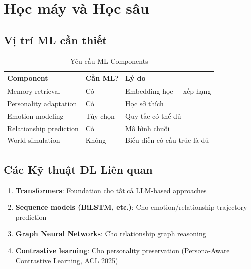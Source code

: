 \section{Học máy và Học sâu}

\subsection{Vị trí ML cần thiết}

\begin{table}[H]
\centering
\caption{Yêu cầu ML Components}
\label{tab:ml-requirements}
\begin{tabular}{lll}
\toprule
\textbf{Component} & \textbf{Cần ML?} & \textbf{Lý do} \\
\midrule
Memory retrieval & Có & Embedding học + xếp hạng \\
Personality adaptation & Có & Học sở thích \\
Emotion modeling & Tùy chọn & Quy tắc có thể đủ \\
Relationship prediction & Có & Mô hình chuỗi \\
World simulation & Không & Biểu diễn có cấu trúc là đủ \\
\bottomrule
\end{tabular}
\end{table}

\subsection{Các Kỹ thuật DL Liên quan}

\begin{enumerate}
    \item \textbf{Transformers}: Foundation cho tất cả LLM-based approaches
    \item \textbf{Sequence models (BiLSTM, etc.)}: Cho emotion/relationship trajectory prediction
    \item \textbf{Graph Neural Networks}: Cho relationship graph reasoning
    \item \textbf{Contrastive learning}: Cho personality preservation (Persona-Aware Contrastive Learning, ACL 2025)
\end{enumerate}


